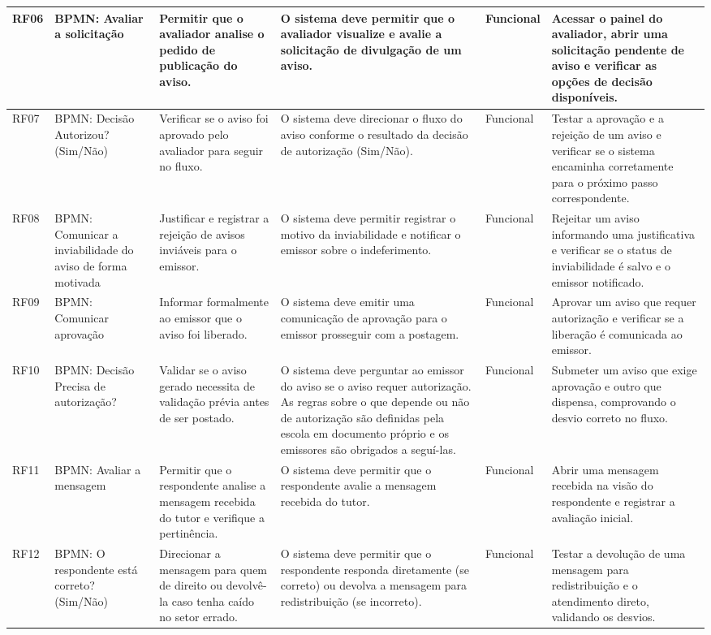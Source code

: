 \documentclass[a4paper,12pt]{report}
\begin{document}
\begin{longtable}{|p{1.1cm}|p{2.5cm}|p{2.8cm}|p{3.4cm}|p{1.6cm}|p{3.0cm}|}
\hline
RF06 & BPMN: Avaliar a solicitação & Permitir que o avaliador analise o pedido de publicação do aviso. & O sistema deve permitir que o avaliador visualize e avalie a solicitação de divulgação de um aviso. & Funcional & Acessar o painel do avaliador, abrir uma solicitação pendente de aviso e verificar as opções de decisão disponíveis. \\
\hline
RF07 & BPMN: Decisão Autorizou? (Sim/Não) & Verificar se o aviso foi aprovado pelo avaliador para seguir no fluxo. & O sistema deve direcionar o fluxo do aviso conforme o resultado da decisão de autorização (Sim/Não). & Funcional & Testar a aprovação e a rejeição de um aviso e verificar se o sistema encaminha corretamente para o próximo passo correspondente. \\
\hline
RF08 & BPMN: Comunicar a inviabilidade do aviso de forma motivada & Justificar e registrar a rejeição de avisos inviáveis para o emissor. & O sistema deve permitir registrar o motivo da inviabilidade e notificar o emissor sobre o indeferimento. & Funcional & Rejeitar um aviso informando uma justificativa e verificar se o status de inviabilidade é salvo e o emissor notificado. \\
\hline
RF09 & BPMN: Comunicar aprovação & Informar formalmente ao emissor que o aviso foi liberado. & O sistema deve emitir uma comunicação de aprovação para o emissor prosseguir com a postagem. & Funcional & Aprovar um aviso que requer autorização e verificar se a liberação é comunicada ao emissor. \\
\hline
RF10 & BPMN: Decisão Precisa de autorização? & Validar se o aviso gerado necessita de validação prévia antes de ser postado. & O sistema deve perguntar ao emissor do aviso se o aviso requer autorização. As regras sobre o que depende ou não de autorização são definidas pela escola em documento próprio e os emissores são obrigados a seguí-las. & Funcional & Submeter um aviso que exige aprovação e outro que dispensa, comprovando o desvio correto no fluxo. \\
\hline
RF11 & BPMN: Avaliar a mensagem & Permitir que o respondente analise a mensagem recebida do tutor e verifique a pertinência. & O sistema deve permitir que o respondente avalie a mensagem recebida do tutor. & Funcional & Abrir uma mensagem recebida na visão do respondente e registrar a avaliação inicial. \\
\hline
RF12 & BPMN: O respondente está correto? (Sim/Não) & Direcionar a mensagem para quem de direito ou devolvê-la caso tenha caído no setor errado. & O sistema deve permitir que o respondente responda diretamente (se correto) ou devolva a mensagem para redistribuição (se incorreto). & Funcional & Testar a devolução de uma mensagem para redistribuição e o atendimento direto, validando os desvios. \\

\end{longtable}
\end{document}
